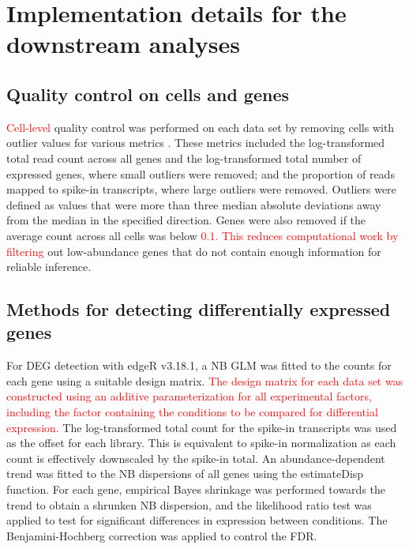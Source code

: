 \documentclass{article}
\newcommand\revised[1]{\textcolor{red}{#1}}
\begin{document}
\section{Implementation details for the downstream analyses}

\subsection{Quality control on cells and genes}
\revised{Cell-level} quality control was performed on each data set by removing cells with outlier values for various metrics \citep{lun2016stepbystep}.
These metrics included the log-transformed total read count across all genes and the log-transformed total number of expressed genes, where small outliers were removed; 
and the proportion of reads mapped to spike-in transcripts, where large outliers were removed.
Outliers were defined as values that were more than three median absolute deviations away from the median in the specified direction.
Genes were also removed if the average count across all cells was below \revised{0.1.
This reduces computational work by filtering} out low-abundance genes that do not contain enough information for reliable inference.

\subsection{Methods for detecting differentially expressed genes}
For DEG detection with edgeR v3.18.1, a NB GLM was fitted to the counts for each gene \citep{mccarthy2012differential} using a suitable design matrix.
\revised{The design matrix for each data set was constructed using an additive parameterization for all experimental factors, including the factor containing the conditions to be compared for differential expression.}
The log-transformed total count for the spike-in transcripts was used as the offset for each library.
This is equivalent to spike-in normalization as each count is effectively downscaled by the spike-in total.
An abundance-dependent trend was fitted to the NB dispersions of all genes using the estimateDisp function.
For each gene, empirical Bayes shrinkage was performed towards the trend to obtain a shrunken NB dispersion, and the likelihood ratio test was applied to test for significant differences in expression between conditions.
The Benjamini-Hochberg correction was applied to control the FDR.
\end{document}
